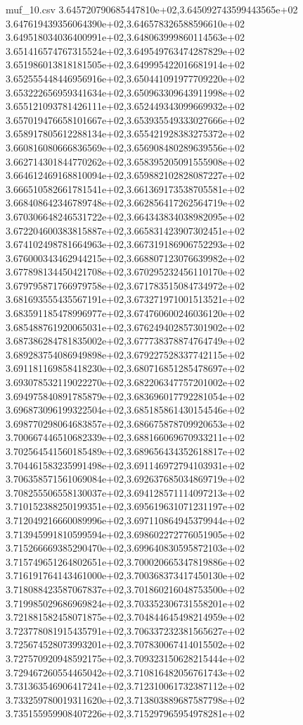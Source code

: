 \begin{filecontents*}{muf_10.csv}
3.645720790685447810e+02,3.645092743599443565e+02
3.647619439356064390e+02,3.646578326588596610e+02
3.649518034036400991e+02,3.648063999860114563e+02
3.651416574767315524e+02,3.649549763474287829e+02
3.651986013818181505e+02,3.649995422016681914e+02
3.652555448446956916e+02,3.650441091977709220e+02
3.653222656959341634e+02,3.650963309643911998e+02
3.655121093781426111e+02,3.652449343099669932e+02
3.657019476658101667e+02,3.653935549333027666e+02
3.658917805612288134e+02,3.655421928383275372e+02
3.660816080666836569e+02,3.656908480289639556e+02
3.662714301844770262e+02,3.658395205091555908e+02
3.664612469168810094e+02,3.659882102828087227e+02
3.666510582661781541e+02,3.661369173538705581e+02
3.668408642346789748e+02,3.662856417262564719e+02
3.670306648246531722e+02,3.664343834038982095e+02
3.672204600383815887e+02,3.665831423907302451e+02
3.674102498781664963e+02,3.667319186906752293e+02
3.676000343462944215e+02,3.668807123076639982e+02
3.677898134450421708e+02,3.670295232456110170e+02
3.679795871766979758e+02,3.671783515084734972e+02
3.681693555435567191e+02,3.673271971001513521e+02
3.683591185478996977e+02,3.674760600246036120e+02
3.685488761920065031e+02,3.676249402857301902e+02
3.687386284781835002e+02,3.677738378874764749e+02
3.689283754086949898e+02,3.679227528337742115e+02
3.691181169858418230e+02,3.680716851285478697e+02
3.693078532119022270e+02,3.682206347757201002e+02
3.694975840891785879e+02,3.683696017792281054e+02
3.696873096199322504e+02,3.685185861430154546e+02
3.698770298064683857e+02,3.686675878709920653e+02
3.700667446510682339e+02,3.688166069670933211e+02
3.702564541560185489e+02,3.689656434352618817e+02
3.704461583235991498e+02,3.691146972794103931e+02
3.706358571561069084e+02,3.692637685034869719e+02
3.708255506558130037e+02,3.694128571114097213e+02
3.710152388250199351e+02,3.695619631071231197e+02
3.712049216660089996e+02,3.697110864945379944e+02
3.713945991810599594e+02,3.698602272776051905e+02
3.715266669385290470e+02,3.699640830595872103e+02
3.715749651264802651e+02,3.700020665347819886e+02
3.716191764143461000e+02,3.700368373417450130e+02
3.718088423587067837e+02,3.701860216048753500e+02
3.719985029686969824e+02,3.703352306731558201e+02
3.721881582458071875e+02,3.704844645498214959e+02
3.723778081915435791e+02,3.706337232381565627e+02
3.725674528073993201e+02,3.707830067414015502e+02
3.727570920948592175e+02,3.709323150628215444e+02
3.729467260554465042e+02,3.710816482056761743e+02
3.731363546906417241e+02,3.712310061732387112e+02
3.733259780019311620e+02,3.713803889687587798e+02
3.735155959908407226e+02,3.715297965954978281e+02

\end{filecontents*}
